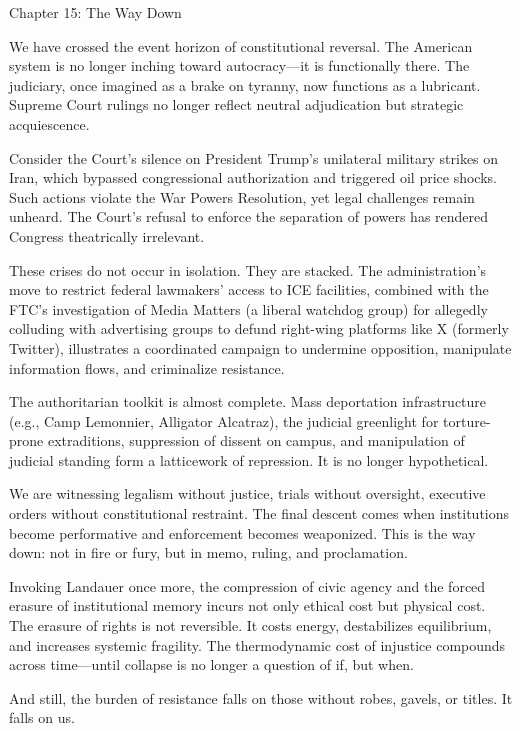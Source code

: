 Chapter 15: The Way Down

We have crossed the event horizon of constitutional reversal. The
American system is no longer inching toward autocracy---it is
functionally there. The judiciary, once imagined as a brake on tyranny,
now functions as a lubricant. Supreme Court rulings no longer reflect
neutral adjudication but strategic acquiescence.

Consider the Court's silence on President Trump's unilateral military
strikes on Iran, which bypassed congressional authorization and
triggered oil price shocks. Such actions violate the War Powers
Resolution, yet legal challenges remain unheard. The Court's refusal to
enforce the separation of powers has rendered Congress theatrically
irrelevant.

These crises do not occur in isolation. They are stacked. The
administration's move to restrict federal lawmakers' access to ICE
facilities, combined with the FTC's investigation of Media Matters (a
liberal watchdog group) for allegedly colluding with advertising groups
to defund right-wing platforms like X (formerly Twitter), illustrates a
coordinated campaign to undermine opposition, manipulate information
flows, and criminalize resistance.

The authoritarian toolkit is almost complete. Mass deportation
infrastructure (e.g., Camp Lemonnier, Alligator Alcatraz), the judicial
greenlight for torture-prone extraditions, suppression of dissent on
campus, and manipulation of judicial standing form a latticework of
repression. It is no longer hypothetical.

We are witnessing legalism without justice, trials without oversight,
executive orders without constitutional restraint. The final descent
comes when institutions become performative and enforcement becomes
weaponized. This is the way down: not in fire or fury, but in memo,
ruling, and proclamation.

Invoking Landauer once more, the compression of civic agency and the
forced erasure of institutional memory incurs not only ethical cost but
physical cost. The erasure of rights is not reversible. It costs energy,
destabilizes equilibrium, and increases systemic fragility. The
thermodynamic cost of injustice compounds across time---until collapse
is no longer a question of if, but when.

And still, the burden of resistance falls on those without robes,
gavels, or titles. It falls on us.
